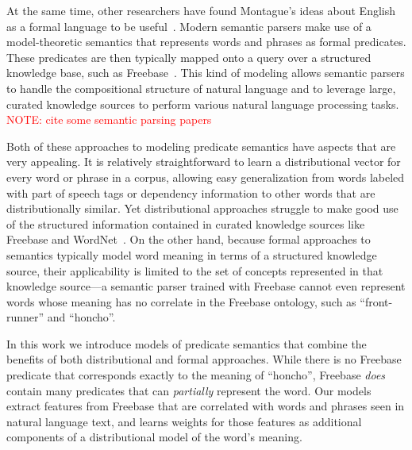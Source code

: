 \documentclass[11pt]{article}
\newcommand{\mattnote}[1]{\textcolor{red}{NOTE: #1}}
\begin{document}
At the same time, other researchers have found Montague's ideas about English
as a formal language to be useful~\cite{montague-1974-english-formal-language}.
Modern semantic parsers make use of a model-theoretic semantics that represents
words and phrases as formal predicates.  These predicates are then typically
mapped onto a query over a structured knowledge base, such as
Freebase~\cite{freebase-2008-bollacker}.  This kind of modeling allows semantic
parsers to handle the compositional structure of natural language and to
leverage large, curated knowledge sources to perform various natural language
processing tasks.  \mattnote{cite some semantic parsing papers}

Both of these approaches to modeling predicate semantics have aspects that are
very appealing.  It is relatively straightforward to learn a distributional
vector for every word or phrase in a corpus, allowing easy generalization from
words labeled with part of speech tags or dependency information to other words
that are distributionally similar.  Yet distributional approaches struggle to
make good use of the structured information contained in curated knowledge
sources like Freebase and WordNet~\cite{wordnet-1995}.  On the other hand,
because formal approaches to semantics typically model word meaning in terms of
a structured knowledge source, their applicability is limited to the set of
concepts represented in that knowledge source---a semantic parser trained with
Freebase cannot even represent words whose meaning has no correlate in the
Freebase ontology, such as ``front-runner'' and ``honcho''.

In this work we introduce models of predicate semantics that combine the
benefits of both distributional and formal approaches.  While there is no
Freebase predicate that corresponds exactly to the meaning of ``honcho'',
Freebase \emph{does} contain many predicates that can \emph{partially}
represent the word.  Our models extract features from Freebase that are
correlated with words and phrases seen in natural language text, and learns
weights for those features as additional components of a distributional model
of the word's meaning.
\end{document}
